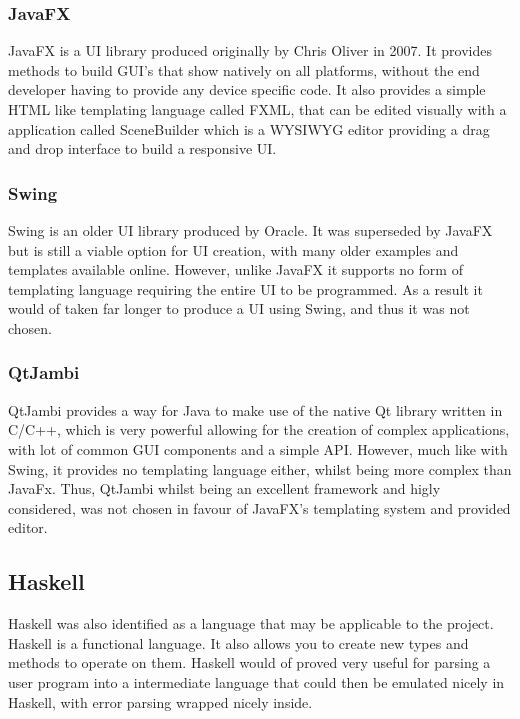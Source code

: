 \subsubsection{JavaFX}
JavaFX \cite{sunmicrosystems_2022_javafx} is a \ac{UI} library produced originally by Chris Oliver in 2007. It provides methods to build GUI's that show natively on all platforms, without the end developer having to provide any device specific code. It also provides a simple HTML like templating language called FXML, that can be edited visually with a application called SceneBuilder \cite{gluon_2022_scene} which is a \ac{WYSIWYG} editor providing a drag and drop interface to build a responsive \ac{UI}.

\subsubsection{Swing}
Swing \cite{oconner_2007_using} is an older \ac{UI} library produced by Oracle. It was superseded by JavaFX but is still a viable option for \ac{UI} creation, with many older examples and templates available online. However, unlike JavaFX it supports no form of templating language requiring the entire \ac{UI} to be programmed. As a result it would of taken far longer to produce a \ac{UI} using Swing, and thus it was not chosen.

\subsubsection{QtJambi}
QtJambi \cite{omixvisualization_2023_omixvisualizationqtjambi} provides a way for Java to make use of the native Qt library written in C/C++, which is very powerful allowing for the creation of complex applications, with lot of common GUI components and a simple API. However, much like with Swing, it provides no templating language either, whilst being more complex than JavaFx. Thus, QtJambi whilst being an excellent framework and higly considered, was not chosen in favour of JavaFX's templating system and provided editor.

\subsection{Haskell}
Haskell \cite{marlow_2010_haskell} was also identified as a language that may be applicable to the project. Haskell is a functional language. It also allows you to create new types and methods to operate on them. Haskell would of proved very useful for parsing a user program into a intermediate language that could then be emulated nicely in Haskell, with error parsing wrapped nicely inside.

